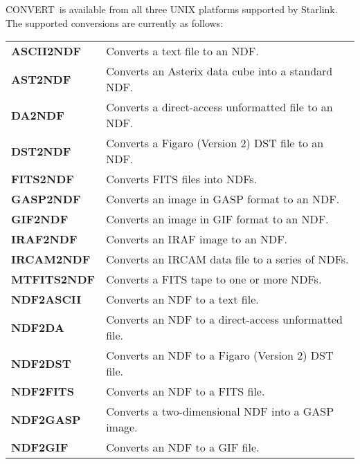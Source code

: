 \documentclass[twoside,11pt]{article}
\newcommand{\htmlref}[2]{#1}
\newenvironment{latexonly}{}{}
\newcommand{\CONVERT}{{\footnotesize CONVERT}}
\begin{document}
\CONVERT\ is available from all three UNIX platforms supported by
Starlink.  The supported conversions are currently as follows: 

\begin{center}
\begin{small}
\begin{tabular}{l@{ -- }p{125mm}}
{\bf \htmlref{ASCII2NDF}{ASCII2NDF}}
& Converts a text file to an NDF. \\[\medskipamount]
{\bf \htmlref{AST2NDF}{AST2NDF}}
& Converts an Asterix data cube into a standard NDF. \\[\medskipamount]
{\bf \htmlref{DA2NDF}{DA2NDF}} 
& Converts a direct-access unformatted file to an NDF. \\[\medskipamount]
{\bf \htmlref{DST2NDF}{DST2NDF}}
& Converts a Figaro (Version 2) DST file to an NDF. \\[\medskipamount]
{\bf \htmlref{FITS2NDF}{FITS2NDF}}
& Converts FITS files into NDFs. \\[\medskipamount]
{\bf \htmlref{GASP2NDF}{GASP2NDF}}
& Converts an image in GASP format to an NDF. \\[\medskipamount]
{\bf \htmlref{GIF2NDF}{GIF2NDF}}
& Converts an image in GIF format to an NDF. \\[\medskipamount]
{\bf \htmlref{IRAF2NDF}{IRAF2NDF}}
& Converts an IRAF image to an NDF. \\[\medskipamount]
{\bf \htmlref{IRCAM2NDF}{IRCAM2NDF}}
& Converts an IRCAM data file to a series of NDFs. \\[\medskipamount]
{\bf \htmlref{MTFITS2NDF}{MTFITS2NDF}}
& Converts a FITS tape to one or more NDFs. \\[\medskipamount]
{\bf \htmlref{NDF2ASCII}{NDF2ASCII}}
& Converts an NDF to a text file. \\[\medskipamount]
{\bf \htmlref{NDF2DA}{NDF2DA}}
& Converts an NDF to a direct-access unformatted file. \\[\medskipamount]
{\bf \htmlref{NDF2DST}{NDF2DST}}
& Converts an NDF to a Figaro (Version 2) DST file. \\[\medskipamount]
{\bf \htmlref{NDF2FITS}{NDF2FITS}}
& Converts an NDF to a FITS file. \\[\medskipamount]
{\bf \htmlref{NDF2GASP}{NDF2GASP}}
& Converts a two-dimensional NDF into a GASP image. \\[\medskipamount]
{\bf \htmlref{NDF2GIF}{NDF2GIF}}
& Converts an NDF to a GIF file. \\[\medskipamount]

\end{tabular}
\end{small}
\end{center}
\end{document}
